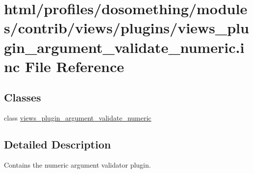 \hypertarget{views__plugin__argument__validate__numeric_8inc}{
\section{html/profiles/dosomething/modules/contrib/views/plugins/views\_\-plugin\_\-argument\_\-validate\_\-numeric.inc File Reference}
\label{views__plugin__argument__validate__numeric_8inc}
}
\subsection*{Classes}
\begin{DoxyCompactItemize}
\item 
class \hyperlink{classviews__plugin__argument__validate__numeric}{views\_\-plugin\_\-argument\_\-validate\_\-numeric}
\end{DoxyCompactItemize}


\subsection{Detailed Description}
Contains the numeric argument validator plugin. 